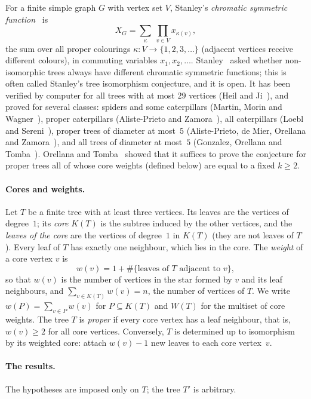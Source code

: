 \documentclass[11pt]{article}
\theoremstyle{definition}
\theoremstyle{remark}
\begin{document}
For a finite simple graph $G$ with vertex set $V$, Stanley's \emph{chromatic
symmetric function}~\cite{stanley} is
\[
X_G=\sum_{\kappa}\ \prod_{v\in V}x_{\kappa(v)},
\]
the sum over all proper colourings $\kappa:V\to\{1,2,3,\dots\}$ (adjacent
vertices receive different colours), in commuting variables $x_1,x_2,\dots$.
Stanley~\cite{stanley} asked whether non-isomorphic trees always have different
chromatic symmetric functions; this is often called Stanley's tree isomorphism
conjecture, and it is open. It has been verified by computer for all trees with
at most $29$ vertices (Heil and Ji~\cite[Theorem~4.5]{hj}), and proved for several
classes: spiders and some caterpillars (Martin, Morin and
Wagner~\cite{mmw}), proper caterpillars (Aliste-Prieto and Zamora~\cite{apz}),
all caterpillars (Loebl and Sereni~\cite[Theorem~2]{ls}), proper trees of
diameter at most~$5$ (Aliste-Prieto, de Mier, Orellana and
Zamora~\cite[Corollary~7.14]{apdmoz}), and all trees of diameter at most~$5$
(Gonzalez, Orellana and Tomba~\cite[Theorem~5.20, Proposition~5.24 and
Theorem~5.27]{got}). Orellana and
Tomba~\cite[Corollary~4.12]{ot} showed that it suffices to prove the conjecture
for proper trees all of whose core weights (defined below) are equal to a fixed
$k\ge2$.

\paragraph{Cores and weights.} Let $T$ be a finite tree with at least three
vertices. Its leaves are the vertices of degree~$1$; its \emph{core} $K(T)$ is
the subtree induced by the other vertices, and the \emph{leaves of the core} are
the vertices of degree~$1$ in $K(T)$ (they are not leaves of $T$). Every leaf of
$T$ has exactly one neighbour, which lies in the core. The \emph{weight} of a
core vertex $v$ is
\[
w(v)=1+\#\{\text{leaves of $T$ adjacent to $v$}\},
\]
so that $w(v)$ is the number of vertices in the star formed by $v$ and its leaf
neighbours, and $\sum_{v\in K(T)}w(v)=n$, the number of vertices of $T$. We write
$w(P)=\sum_{v\in P}w(v)$ for $P\subseteq K(T)$ and $W(T)$ for the multiset of
core weights. The tree $T$ is \emph{proper} if every core vertex has a leaf
neighbour, that is, $w(v)\ge2$ for all core vertices. Conversely, $T$ is
determined up to isomorphism by its weighted core: attach $w(v)-1$ new leaves to
each core vertex~$v$.

\paragraph{The results.} The hypotheses are imposed only on $T$; the tree $T'$
is arbitrary.
\end{document}
